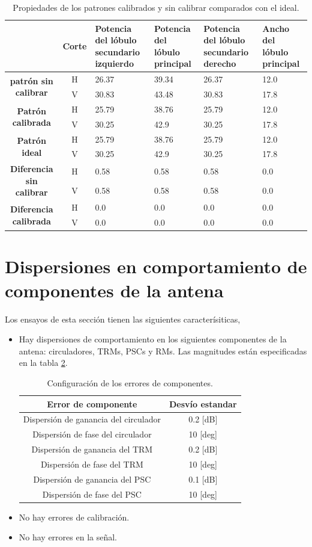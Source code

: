 \begin{table}[H]
  \footnotesize
  \centering
  \begin{tabular}{|c|c|p{2cm}|p{2cm}|p{2cm}|p{2cm}|}
    \cline{2-6}
    \multicolumn{1}{c|}{} & \textbf{Corte} & \textbf{Potencia del lóbulo secundario izquierdo} & \textbf{Potencia del lóbulo principal} &
    \textbf{Potencia del lóbulo secundario derecho} & \textbf{Ancho del lóbulo principal} \tabularnewline\hline
    \multirow{2}{*}{\textbf{patrón sin calibrar}} & H & 26.37 & 39.34 & 26.37 & 12.0 \tabularnewline\cline{2-6}
     & V & 30.83 & 43.48 & 30.83 & 17.8 \tabularnewline\hline
    \multirow{2}{*}{\textbf{Patrón calibrada}} & H & 25.79 & 38.76 & 25.79 & 12.0 \tabularnewline\cline{2-6}
     & V & 30.25 & 42.9 & 30.25 & 17.8 \tabularnewline\hline
    \multirow{2}{*}{\textbf{Patrón ideal}} & H & 25.79 & 38.76 & 25.79 & 12.0 \tabularnewline\cline{2-6}
     & V & 30.25 & 42.9 & 30.25 & 17.8 \tabularnewline\hline
    \multirow{2}{*}{\textbf{Diferencia sin calibrar}} & H & 0.58 & 0.58 & 0.58 & 0.0\tabularnewline\cline{2-6}
     & V & 0.58 & 0.58 & 0.58 & 0.0 \tabularnewline\hline
    \multirow{2}{*}{\textbf{Diferencia calibrada}} & H & 0.0 & 0.0 & 0.0 & 0.0 \tabularnewline\cline{2-6}
     & V & 0.0 & 0.0 & 0.0 & 0.0 \tabularnewline\hline
  \end{tabular}
  \caption{Propiedades de los patrones calibrados y sin calibrar comparados con el ideal.}
  \label{tab:deadTRMsMutual10degRow}
\end{table}


\section{Dispersiones en comportamiento de componentes de la antena}

Los ensayos de esta sección tienen las siguientes caracterísiticas,
\begin{itemize}
	\item Hay dispersiones de comportamiento en los siguientes componentes de la antena: circuladores, TRMs, PSCs y RMs. Las 
		magnitudes están especificadas en la tabla \ref{tab:errorReferences}.
		\begin{table}[H]
		  \footnotesize
		  \centering
		  \begin{tabular}{|c|c|}
			\hline
			\textbf{Error de componente} & \textbf{Desvío estandar} \tabularnewline \hline 
			Dispersión de ganancia del circulador &  0.2 [dB] \tabularnewline\hline 
			Dispersión de fase del circulador &  10 [deg] \tabularnewline\hline 
			Dispersión de ganancia del TRM &  0.2 [dB] \tabularnewline\hline 
			Dispersión de fase del TRM &  10 [deg] \tabularnewline\hline 
			Dispersión de ganancia del PSC &  0.1 [dB] \tabularnewline\hline 
			Dispersión de fase del PSC &  10 [deg] \tabularnewline\hline 
		  \end{tabular}
		  \caption{Configuración de los errores de componentes.}
		  \label{tab:errorReferences}
		\end{table}
	\item No hay errores de calibración.
	\item No hay errores en la señal.
\end{itemize}

